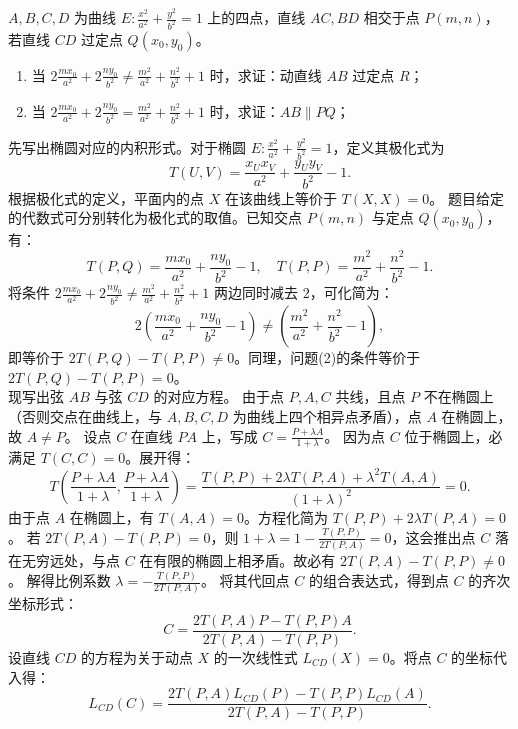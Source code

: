 \begin{example}
 \(A,B,C,D\) 为曲线 \(E: \frac{x^2}{a^2} + \frac{y^2}{b^2} = 1\) 上的四点，直线 \(AC,BD\) 相交于点 \(P(m,n)\)，若直线 \(CD\) 过定点 \(Q(x_0,y_0)\)。
\begin{enumerate}
    \item[(1)] 当 \(2\frac{mx_0}{a^2} + 2\frac{ny_0}{b^2} \neq \frac{m^2}{a^2} + \frac{n^2}{b^2} + 1\) 时，求证：动直线 \(AB\) 过定点 \(R\)；
    \item[(2)] 当 \(2\frac{mx_0}{a^2} + 2\frac{ny_0}{b^2} = \frac{m^2}{a^2} + \frac{n^2}{b^2} + 1\) 时，求证：\(AB \parallel PQ\)；
\end{enumerate}
\end{example}
\begin{solution}
先写出椭圆对应的内积形式。对于椭圆 $E: \frac{x^2}{a^2} + \frac{y^2}{b^2} = 1$，定义其极化式为
\[ T(U, V) = \frac{x_U x_V}{a^2} + \frac{y_U y_V}{b^2} - 1. \]
根据极化式的定义，平面内的点 $X$ 在该曲线上等价于 $T(X, X) = 0$。
题目给定的代数式可分别转化为极化式的取值。已知交点 $P(m,n)$ 与定点 $Q(x_0,y_0)$，有：
\[ T(P, Q) = \frac{mx_0}{a^2} + \frac{ny_0}{b^2} - 1, \quad T(P, P) = \frac{m^2}{a^2} + \frac{n^2}{b^2} - 1. \]
将条件 $2\frac{mx_0}{a^2} + 2\frac{ny_0}{b^2} \neq \frac{m^2}{a^2} + \frac{n^2}{b^2} + 1$ 两边同时减去 $2$，可化简为：
\[ 2\left(\frac{mx_0}{a^2} + \frac{ny_0}{b^2} - 1\right) \neq \left(\frac{m^2}{a^2} + \frac{n^2}{b^2} - 1\right), \]
即等价于 $2T(P, Q) - T(P, P) \neq 0$。同理，问题(2)的条件等价于 $2T(P, Q) - T(P, P) = 0$。\\
现写出弦 $AB$ 与弦 $CD$ 的对应方程。
由于点 $P, A, C$ 共线，且点 $P$ 不在椭圆上（否则交点在曲线上，与 $A,B,C,D$ 为曲线上四个相异点矛盾），点 $A$ 在椭圆上，故 $A \neq P$。
设点 $C$ 在直线 $PA$ 上，写成 $C = \frac{P + \lambda A}{1+\lambda}$。
因为点 $C$ 位于椭圆上，必满足 $T(C, C) = 0$。展开得：
\[ T\left(\frac{P + \lambda A}{1+\lambda}, \frac{P + \lambda A}{1+\lambda}\right) = \frac{T(P, P) + 2\lambda T(P, A) + \lambda^2 T(A, A)}{(1+\lambda)^2} = 0. \]
由于点 $A$ 在椭圆上，有 $T(A, A) = 0$。方程化简为 $T(P, P) + 2\lambda T(P, A) = 0$。
若 $2T(P, A) - T(P, P) = 0$，则 $1+\lambda = 1 - \frac{T(P, P)}{2T(P, A)} = 0$，这会推出点 $C$ 落在无穷远处，与点 $C$ 在有限的椭圆上相矛盾。故必有 $2T(P, A) - T(P, P) \neq 0$。
解得比例系数 $\lambda = -\frac{T(P, P)}{2T(P, A)}$。
将其代回点 $C$ 的组合表达式，得到点 $C$ 的齐次坐标形式：
\[ C = \frac{2T(P, A)P - T(P, P)A}{2T(P, A) - T(P, P)}. \]
设直线 $CD$ 的方程为关于动点 $X$ 的一次线性式 $L_{CD}(X) = 0$。将点 $C$ 的坐标代入得：
\[ L_{CD}(C) = \frac{2T(P, A)L_{CD}(P) - T(P, P)L_{CD}(A)}{2T(P, A) - T(P, P)}. \]

\end{solution}

